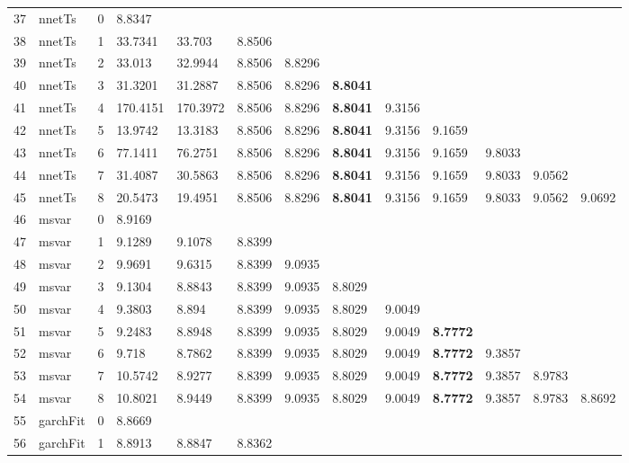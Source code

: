\documentclass[10pt,a4paper]{article}
\begin{document}
\begin{table}[ht]
\begin{tabular}{rlrllllllllll}
   \hline
37 & nnetTs &     0 & 8.8347 &  &  &  &  &  &  &  &  &  \\ 
  38 & nnetTs &     1 & 33.7341 & 33.703 & 8.8506 &  &  &  &  &  &  &  \\ 
  39 & nnetTs &     2 & 33.013 & 32.9944 & 8.8506 & 8.8296 &  &  &  &  &  &  \\ 
  40 & nnetTs &     3 & 31.3201 & 31.2887 & 8.8506 & 8.8296 & \textbf{8.8041} &  &  &  &  &  \\ 
  41 & nnetTs &     4 & 170.4151 & 170.3972 & 8.8506 & 8.8296 & \textbf{8.8041} & 9.3156 &  &  &  &  \\ 
  42 & nnetTs &     5 & 13.9742 & 13.3183 & 8.8506 & 8.8296 & \textbf{8.8041} & 9.3156 & 9.1659 &  &  &  \\ 
  43 & nnetTs &     6 & 77.1411 & 76.2751 & 8.8506 & 8.8296 & \textbf{8.8041} & 9.3156 & 9.1659 & 9.8033 &  &  \\ 
  44 & nnetTs &     7 & 31.4087 & 30.5863 & 8.8506 & 8.8296 & \textbf{8.8041} & 9.3156 & 9.1659 & 9.8033 & 9.0562 &  \\ 
  45 & nnetTs &     8 & 20.5473 & 19.4951 & 8.8506 & 8.8296 & \textbf{8.8041} & 9.3156 & 9.1659 & 9.8033 & 9.0562 & 9.0692 \\ 
   \hline
46 & msvar &     0 & 8.9169 &  &  &  &  &  &  &  &  &  \\ 
  47 & msvar &     1 & 9.1289 & 9.1078 & 8.8399 &  &  &  &  &  &  &  \\ 
  48 & msvar &     2 & 9.9691 & 9.6315 & 8.8399 & 9.0935 &  &  &  &  &  &  \\ 
  49 & msvar &     3 & 9.1304 & 8.8843 & 8.8399 & 9.0935 & 8.8029 &  &  &  &  &  \\ 
  50 & msvar &     4 & 9.3803 & 8.894 & 8.8399 & 9.0935 & 8.8029 & 9.0049 &  &  &  &  \\ 
  51 & msvar &     5 & 9.2483 & 8.8948 & 8.8399 & 9.0935 & 8.8029 & 9.0049 & \textbf{8.7772} &  &  &  \\ 
  52 & msvar &     6 & 9.718 & 8.7862 & 8.8399 & 9.0935 & 8.8029 & 9.0049 & \textbf{8.7772} & 9.3857 &  &  \\ 
  53 & msvar &     7 & 10.5742 & 8.9277 & 8.8399 & 9.0935 & 8.8029 & 9.0049 & \textbf{8.7772} & 9.3857 & 8.9783 &  \\ 
  54 & msvar &     8 & 10.8021 & 8.9449 & 8.8399 & 9.0935 & 8.8029 & 9.0049 & \textbf{8.7772} & 9.3857 & 8.9783 & 8.8692 \\ 
   \hline
55 & garchFit &     0 & 8.8669 &  &  &  &  &  &  &  &  &  \\ 
  56 & garchFit &     1 & 8.8913 & 8.8847 & 8.8362 &  &  &  &  &  &  &  \\ 

\end{tabular}
\end{table}
\end{document}
